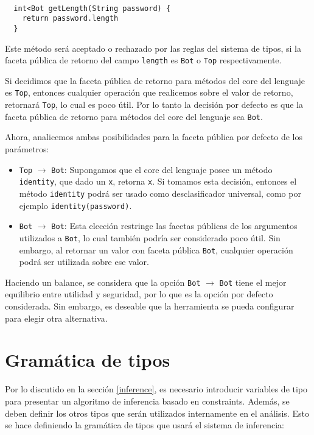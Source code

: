 \begin{ej} \ \\
  \label{ej-necesidad}
  \normalfont
\begin{lstlisting}
  int<Bot getLength(String password) {
    return password.length
  }
\end{lstlisting}
\end{ej}



Este método será aceptado o rechazado por las reglas del sistema de tipos, si la faceta pública de retorno del campo \texttt{length} es \texttt{Bot} o \texttt{Top} respectivamente.

Si decidimos que la faceta pública de retorno para métodos del core del lenguaje es \texttt{Top}, entonces cualquier operación que realicemos sobre el valor de retorno, retornará \texttt{Top}, lo cual es poco útil. Por lo tanto la decisión por defecto es que la faceta pública de retorno para métodos del core del lenguaje sea \texttt{Bot}.

Ahora, analicemos ambas posibilidades para la faceta pública por defecto de los parámetros:

\begin{itemize}
  \item \texttt{Top} $\rightarrow$ \texttt{Bot}: Supongamos que el core del lenguaje posee un método \texttt{identity}, que dado un \texttt{x}, retorna \texttt{x}. Si tomamos esta decisión, entonces el método \texttt{identity} podrá ser usado como desclasificador universal, como por ejemplo \texttt{identity(password)}.
  \item \texttt{Bot} $\rightarrow$ \texttt{Bot}: Esta elección restringe las facetas públicas de los argumentos utilizados a \texttt{Bot}, lo cual también podría ser considerado poco útil. Sin embargo, al retornar un valor con faceta pública \texttt{Bot}, cualquier operación podrá ser utilizada sobre ese valor.
\end{itemize}

Haciendo un balance, se considera que la opción \texttt{Bot} $\rightarrow$ \texttt{Bot} tiene el mejor equilibrio entre utilidad y seguridad, por lo que es la opción por defecto considerada. Sin embargo, es deseable que la herramienta se pueda configurar para elegir otra alternativa.

\section{Gramática de tipos}
Por lo discutido en la sección \ref{inference}, es necesario introducir variables de tipo para presentar un algoritmo de inferencia basado en constraints. Además, se deben definir los otros tipos que serán utilizados internamente en el análisis. Esto se hace definiendo la gramática de tipos que usará el sistema de inferencia:

